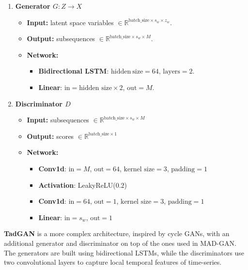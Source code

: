 \begin{enumerate}
    \item \textbf{Generator $G: Z \to X$}
    \begin{itemize}
        \item \textbf{Input:} latent space variables $ \in \mathbb{R}^{\text{batch\_size} \times s_w \times z_w}$.
        \item \textbf{Output:} subsequences $ \in \mathbb{R}^{\text{batch\_size} \times s_w \times M}$.
        \item \textbf{Network:} 
            \begin{itemize}
                \item \textbf{Bidirectional LSTM}: $\text{hidden} \: \text{size} = 64$, $\text{layers} = 2$.
                \item \textbf{Linear}: $\text{in} = \text{hidden size} \times 2$, $\text{out} = M$.
            \end{itemize}
    \end{itemize}
    
    \item \textbf{Discriminator $D$}
    \begin{itemize}
        \item \textbf{Input:} subsequences $ \in \mathbb{R}^{\text{batch\_size} \times s_w \times M}$
        \item \textbf{Output:} scores $ \in \mathbb{R}^{\text{batch\_size} \times 1}$
        \item \textbf{Network:} 
            \begin{itemize}
                \item \textbf{Conv1d}: $\text{in} = M$, $\text{out} = 64$, $\text{kernel size} = 3$, $\text{padding}=1$
                \item \textbf{Activation}: LeakyReLU($0.2$)                
                \item \textbf{Conv1d}: $\text{in} = 64$, $\text{out} = 1$, $\text{kernel size} = 3$, $\text{padding}=1$
                \item \textbf{Linear}: $\text{in} = s_w$, $\text{out} = 1$
            \end{itemize}
    \end{itemize}
\end{enumerate}

\textbf{TadGAN} is a more complex architecture, inspired by cycle GANs, with an additional generator and discriminator on top of the ones used in MAD-GAN. The generators are built using bidirectional LSTMs, while the discriminators use two convolutional layers to capture local temporal features of time-series.

